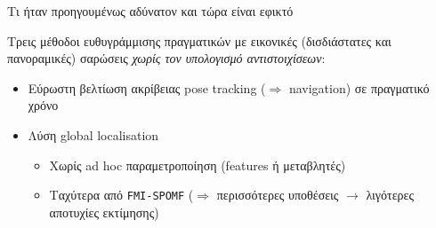 \begin{frame}{Τι ήταν προηγουμένως αδύνατον και τώρα είναι εφικτό}


  \vspace{1cm}
  Τρεις μέθοδοι ευθυγράμμισης πραγματικών με εικονικές (δισδιάστατες και
  πανοραμικές) σαρώσεις \textit{χωρίς τον υπολογισμό αντιστοιχίσεων}:

  \begin{itemize}
    \item Εύρωστη βελτίωση ακρίβειας pose tracking ($\Rightarrow$ navigation) σε πραγματικό χρόνο
    \item Λύση global localisation
      \begin{itemize}
        \item Χωρίς ad hoc παραμετροποίηση (features ή μεταβλητές)
        \item Ταχύτερα από \texttt{FMI-SPOMF} ($\Rightarrow$ περισσότερες υποθέσεις $\rightarrow$ λιγότερες αποτυχίες εκτίμησης)
      \end{itemize}

  \end{itemize}



\end{frame}
